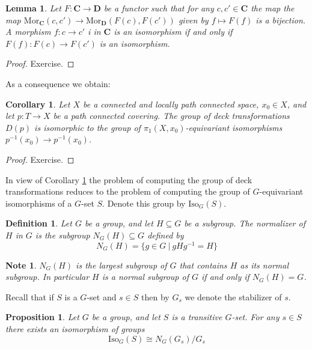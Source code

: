 \documentclass[11pt, letterpaper, oneside]{report}
\theoremstyle{pplain}
\newtheorem{lemma}[theorem]{Lemma}
\newtheorem{proposition}[theorem]{Proposition}
\newtheorem{corollary}[theorem]{Corollary}
\theoremstyle{ddefinition}
\newtheorem{definition}[theorem]{Definition}
\newtheorem{note}[theorem]{Note}
\theoremstyle{nnn}
\theoremstyle{eexercise}
\newcommand{\Mor}{\mathrm{Mor}}
\newcommand{\Iso}{\mathrm{Iso}}
\newcommand{\CC}{{\mathbf C}}
\newcommand{\DD}{{\mathbf D}}
\begin{document}
\begin{lemma}
Let $F\colon \CC \to \DD$ be a functor such that for any $c, c'\in \CC$ the map 
the map $\Mor_{\CC}(c, c') \to \Mor_{\DD}(F(c), F(c'))$ given by $f\mapsto F(f)$ is a bijection. A morphism  
$f\colon c\to c'$ i in $\CC$ is an isomorphism if and only if  $F(f)\colon F(c) \to F(c')$ is an isomorphism.  
\end{lemma} 


\begin{proof}
Exercise. 
\end{proof}

As a consequence we obtain:

\begin{corollary}
\label{DECK TO EQUIV ISO COR}
Let $X$ be a connected and locally path connected space, $x_{0}\in X$, and let $p\colon T\to X$ be
a path connected covering. The group of deck transformations $D(p)$ is isomorphic to the 
group of $\pi_{1}(X, x_{0})$-equivariant isomorphisms $p^{-1}(x_{0}) \to p^{-1}(x_{0})$. 
\end{corollary}



\begin{proof}
Exercise. 
\end{proof}

In view of Corollary \ref{DECK TO EQUIV ISO COR} the problem of computing the group of deck transformations 
reduces to the problem of computing the group of $G$-equivariant isomorphisms of a $G$-set $S$. Denote  
this group by $\Iso_{G}(S)$. 

\begin{definition}
Let $G$ be a group, and let $H\subseteq G$ be a subgroup. The \emph{normalizer} of $H$ in $G$ is the 
subgroup $N_{G}(H)\subseteq G$ defined by
$$N_{G}(H) = \{g\in G \ | \  gHg^{-1} = H \}$$
\end{definition}

\begin{note}
$N_{G}(H)$ is the largest subgroup of $G$ that contains $H$ as its normal subgroup. In particular
$H$ is a normal subgroup of $G$ if and only if $N_{G}(H) = G$.  
\end{note}

Recall that if $S$ is a $G$-set and $s\in S$ then by $G_{s}$ we denote the stabilizer of $s$. 

\begin{proposition}
Let $G$ be a group,  and let $S$ is a transitive $G$-set. For any $s\in S$ there exists an isomorphism of groups
$$ \Iso_{G}(S) \cong N_{G}(G_{s})/G_{s}$$
\end{proposition}
\end{document}
